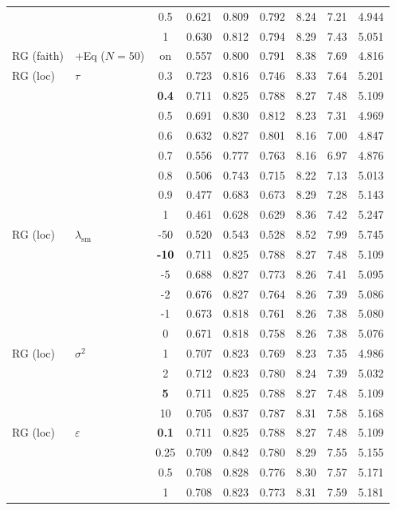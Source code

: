 \begin{longtable}{@{}l l c c c c c c c@{}}
 &  & 0.5 & 0.621 & 0.809 & 0.792 & 8.24 & 7.21 & 4.944 \\
 &  & 1 & 0.630 & 0.812 & 0.794 & 8.29 & 7.43 & 5.051 \\
\midrule
RG (faith) & +Eq ($N{=}50$) & on & 0.557 & 0.800 & 0.791 & 8.38 & 7.69 & 4.816 \\
\midrule
RG (loc) & $\tau$ & 0.3 & 0.723 & 0.816 & 0.746 & 8.33 & 7.64 & 5.201 \\
 &  & \textbf{0.4} & 0.711 & 0.825 & 0.788 & 8.27 & 7.48 & 5.109 \\
 &  & 0.5 & 0.691 & 0.830 & 0.812 & 8.23 & 7.31 & 4.969 \\
 &  & 0.6 & 0.632 & 0.827 & 0.801 & 8.16 & 7.00 & 4.847 \\
 &  & 0.7 & 0.556 & 0.777 & 0.763 & 8.16 & 6.97 & 4.876 \\
 &  & 0.8 & 0.506 & 0.743 & 0.715 & 8.22 & 7.13 & 5.013 \\
 &  & 0.9 & 0.477 & 0.683 & 0.673 & 8.29 & 7.28 & 5.143 \\
 &  & 1 & 0.461 & 0.628 & 0.629 & 8.36 & 7.42 & 5.247 \\
\midrule
RG (loc) & $\lambda_{\mathrm{sm}}$ & {-}50 & 0.520 & 0.543 & 0.528 & 8.52 & 7.99 & 5.745 \\
 &  & \textbf{{-}10} & 0.711 & 0.825 & 0.788 & 8.27 & 7.48 & 5.109 \\
 &  & {-}5 & 0.688 & 0.827 & 0.773 & 8.26 & 7.41 & 5.095 \\
 &  & {-}2 & 0.676 & 0.827 & 0.764 & 8.26 & 7.39 & 5.086 \\
 &  & {-}1 & 0.673 & 0.818 & 0.761 & 8.26 & 7.38 & 5.080 \\
 &  & 0 & 0.671 & 0.818 & 0.758 & 8.26 & 7.38 & 5.076 \\
\midrule
RG (loc) & $\sigma^2$ & 1 & 0.707 & 0.823 & 0.769 & 8.23 & 7.35 & 4.986 \\
 &  & 2 & 0.712 & 0.823 & 0.780 & 8.24 & 7.39 & 5.032 \\
 &  & \textbf{5} & 0.711 & 0.825 & 0.788 & 8.27 & 7.48 & 5.109 \\
 &  & 10 & 0.705 & 0.837 & 0.787 & 8.31 & 7.58 & 5.168 \\
\midrule
RG (loc) & $\varepsilon$ & \textbf{0.1} & 0.711 & 0.825 & 0.788 & 8.27 & 7.48 & 5.109 \\
 &  & 0.25 & 0.709 & 0.842 & 0.780 & 8.29 & 7.55 & 5.155 \\
 &  & 0.5 & 0.708 & 0.828 & 0.776 & 8.30 & 7.57 & 5.171 \\
 &  & 1 & 0.708 & 0.823 & 0.773 & 8.31 & 7.59 & 5.181 \\

\end{longtable}

